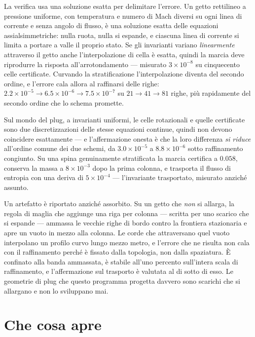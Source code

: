 La verifica usa una soluzione esatta per delimitare l'errore. Un
getto rettilineo a pressione uniforme, con temperatura e numero di
Mach diversi su ogni linea di corrente e senza angolo di flusso, è
una soluzione esatta delle equazioni assialsimmetriche: nulla ruota,
nulla si espande, e ciascuna linea di corrente si limita a portare a
valle il proprio stato. Se gli invarianti variano \emph{linearmente}
attraverso il getto anche l'interpolazione di cella è esatta, quindi
la marcia deve riprodurre la risposta all'arrotondamento --- misurato
$3\times10^{-8}$ su cinquecento celle certificate. Curvando la
stratificazione l'interpolazione diventa del secondo ordine, e
l'errore cala allora al raffinarsi delle righe:
$2.2\times10^{-5} \to 6.5\times10^{-6} \to 7.5\times10^{-7}$ su
$21 \to 41 \to 81$ righe, più rapidamente del secondo ordine che lo
schema promette.

Sul mondo del plug, a invarianti uniformi, le celle rotazionali e
quelle certificate sono due discretizzazioni delle stesse equazioni
continue, quindi non devono coincidere esattamente --- e
l'affermazione onesta è che la loro differenza \emph{si riduce}
all'ordine comune dei due schemi, da $3.0\times10^{-5}$ a
$8.8\times10^{-6}$ sotto raffinamento congiunto. Su una spina
genuinamente stratificata la marcia certifica a $0.058$, conserva la
massa a $8\times10^{-3}$ dopo la prima colonna, e trasporta il flusso
di entropia con una deriva di $5\times10^{-4}$ --- l'invariante
trasportato, misurato anziché assunto.

Un artefatto è riportato anziché assorbito. Su un getto che
\emph{non} si allarga, la regola di maglia che aggiunge una riga per
colonna --- scritta per uno scarico che si espande --- ammassa le
vecchie righe di bordo contro la frontiera stazionaria e apre un
vuoto in mezzo alla colonna. Le corde che attraversano quel vuoto
interpolano un profilo curvo lungo mezzo metro, e l'errore che ne
risulta non cala con il raffinamento perché è fissato dalla
topologia, non dalla spaziatura. È confinato alla banda ammassata, è
stabile all'uno percento sull'intera scala di raffinamento, e
l'affermazione sul trasporto è valutata al di sotto di esso. Le
geometrie di plug che questo programma progetta davvero sono scarichi
che si allargano e non lo sviluppano mai.

\section{Che cosa apre}

